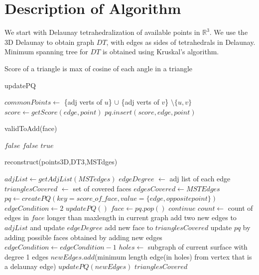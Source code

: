\documentclass[preprint,5p,times,twocolumn]{elsarticle}
\begin{document}
\section{Description of Algorithm}

We start with Delaunay tetrahedralization of available points in $\mathbb{R}^3$. We use the 3D Delaunay to obtain graph $DT$, with edges as sides of tetrahedrals in Delaunay. Minimum spanning tree for $DT$ is obtained using Kruskal's  algorithm.  

Score of a triangle is max of cosine of each angle in a triangle

\begin{algorithm}
\caption{updatePQ}
\begin{algorithmic}
\STATE $commonPoints \leftarrow$ \{adj verts of $u$\} $\cup$ \{adj verts of $v$\} $\setminus \{u,v\}$
\STATE $score \leftarrow getScore(edge, point)$
\STATE $pq.insert(score,edge,point)$
\ENDIF
\ENDFOR
\ENDFOR
\end{algorithmic}
\end{algorithm}

\begin{algorithm}
\caption{validToAdd(face)}
\begin{algorithmic}
\RETURN $false$
\ENDIF
{}
\RETURN $false$
\ENDIF
\ENDFOR
\RETURN $true$
\end{algorithmic}
\end{algorithm}

\begin{algorithm}
\caption{reconstruct(points3D,DT3,MSTdges)}
\begin{algorithmic}
\STATE $adjList \leftarrow getAdjList(MSTedges)$ 
\STATE $edgeDegree$ $\leftarrow$ adj list of each edge
\STATE $trianglesCovered$ $\leftarrow$ set of covered faces
\STATE $edgesCovered \leftarrow MSTEdges$ 
\STATE $pq \leftarrow createPQ(key=score\_of\_face,value=\{edge,opposite point\})$
\STATE $edgeCondition \leftarrow 2$ 
\STATE $updatePQ()$
\STATE $face \leftarrow pq.pop()$
\STATE $continue$
\ENDIF
\STATE $count \leftarrow$ count of edges in $face$ longer than maxlength in current graph
\STATE add two new edges to $adjList$ and update $edgeDegree$
\STATE add new face to $trianglesCovered$		
\STATE update $pq$ by adding possible faces obtained by adding new edges
\ENDIF
\ENDWHILE
\STATE $edgeCondition \leftarrow edgeCondition - 1$
\STATE $holes\leftarrow$  subgraph of current surface with degree 1 edges 		
\STATE $newEdges.add$(minimum length edge(in holes) from vertex that is a delaunay edge)
\ENDFOR
\STATE $updatePQ(newEdges)$
\ENDWHILE
\RETURN $trianglesCovered$
\end{algorithmic}
\end{algorithm}
\end{document}
